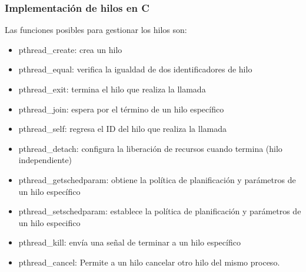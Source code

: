 \subsubsection{Implementación de hilos en C}

Las funciones posibles para gestionar los hilos son:

\begin{itemize}
	\item   pthread\_create: crea un hilo
	\item   pthread\_equal: verifica la igualdad de dos identificadores de hilo
	\item   pthread\_exit: termina el hilo que realiza la llamada
	\item   pthread\_join: espera por el término de un hilo específico
	\item   pthread\_self: regresa el ID del hilo que realiza la llamada
	\item   pthread\_detach: configura la liberación de recursos cuando termina (hilo independiente)
	\item   pthread\_getschedparam: obtiene la política de planificación y parámetros de un hilo específico \item   pthread\_setschedparam: establece la política de planificación y parámetros de un hilo especifico \item   pthread\_kill: envía una señal de terminar a un hilo específico
	\item   pthread\_cancel: Permite a un hilo cancelar otro hilo del mismo proceso.
\end{itemize}
